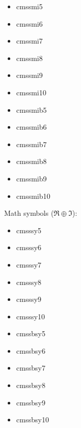 \documentclass{amsart}
\begin{document}
\noindent\parbox[t]{0.25\textwidth}{
\begin{itemize}
\item \textsf{cmssmi5}
\item \textsf{cmssmi6}
\item \textsf{cmssmi7}
\end{itemize}}\parbox[t]{0.25\textwidth}{\begin{itemize}
\item \textsf{cmssmi8}
\item \textsf{cmssmi9}
\item \textsf{cmssmi10}
\end{itemize}}\parbox[t]{0.25\textwidth}{\begin{itemize}
\item \textsf{cmssmib5}
\item \textsf{cmssmib6}
\item \textsf{cmssmib7}
\end{itemize}}\parbox[t]{0.25\textwidth}{\begin{itemize}
\item \textsf{cmssmib8}
\item \textsf{cmssmib9}
\item \textsf{cmssmib10}
\end{itemize}}

\bigskip

Math symbols ($\Re\oplus \Im  $):

\nobreak

\noindent\parbox[t]{0.25\textwidth}{
\begin{itemize}
\item \textsf{cmsssy5}
\item \textsf{cmsssy6}
\item \textsf{cmsssy7}
\end{itemize}}\parbox[t]{0.25\textwidth}{\begin{itemize}
\item \textsf{cmsssy8}
\item \textsf{cmsssy9}
\item \textsf{cmsssy10}
\end{itemize}}\parbox[t]{0.25\textwidth}{\begin{itemize}
\item \textsf{cmssbsy5}
\item \textsf{cmssbsy6}
\item \textsf{cmssbsy7}
\end{itemize}}\parbox[t]{0.25\textwidth}{\begin{itemize}
\item \textsf{cmssbsy8}
\item \textsf{cmssbsy9}
\item \textsf{cmssbsy10}
\end{itemize}}
\end{document}

